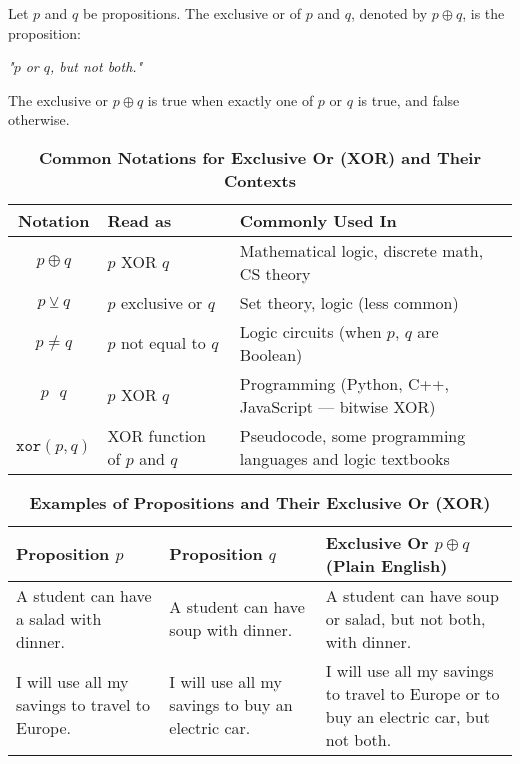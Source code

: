 \vspace{5pt}
\begin{tcolorbox}[title=Definition: Exclusive Or (XOR)]
Let $p$ and $q$ be propositions. The exclusive or of $p$ and $q$, denoted by $p \oplus q$, is the proposition:  
\begin{center}
\textit{"$p$ or $q$, but not both."}
\end{center}
The exclusive or $p \oplus q$ is true when exactly one of $p$ or $q$ is true, and false otherwise.
\end{tcolorbox}
\begin{table}[h!]
\centering
\caption*{\textbf{Common Notations for Exclusive Or (XOR) and Their Contexts}}
\begin{tabular}{|c|l|l|}
\hline
\rowcolor{gray!20}
\textbf{Notation} & \textbf{Read as} & \textbf{Commonly Used In} \\
\hline
$p \oplus q$ & $p$ XOR $q$ & Mathematical logic, discrete math, CS theory \\
$p \veebar q$ & $p$ exclusive or $q$ & Set theory, logic (less common) \\
$p \neq q$ & $p$ not equal to $q$ & Logic circuits (when $p$, $q$ are Boolean) \\
$p \texttt{\^{} } q$ & $p$ XOR $q$ & Programming (Python, C++, JavaScript — bitwise XOR) \\
$\texttt{xor}(p, q)$ & XOR function of $p$ and $q$ & Pseudocode, some programming languages and logic textbooks \\
\hline
\end{tabular}
\end{table}
\begin{table}[h!]
\centering
\caption*{\textbf{Examples of Propositions and Their Exclusive Or (XOR)}}
\begin{tabular}{|p{4.5cm}|p{4.5cm}|p{6cm}|}
\hline
\rowcolor{gray!20}
\textbf{Proposition $p$} & \textbf{Proposition $q$} & \textbf{Exclusive Or $p \oplus q$ (Plain English)} \\
\hline
A student can have a salad with dinner. & A student can have soup with dinner. & A student can have soup or salad, but not both, with dinner. \\
I will use all my savings to travel to Europe. & I will use all my savings to buy an electric car. & I will use all my savings to travel to Europe or to buy an electric car, but not both. \\
\hline
\end{tabular}
\end{table}
